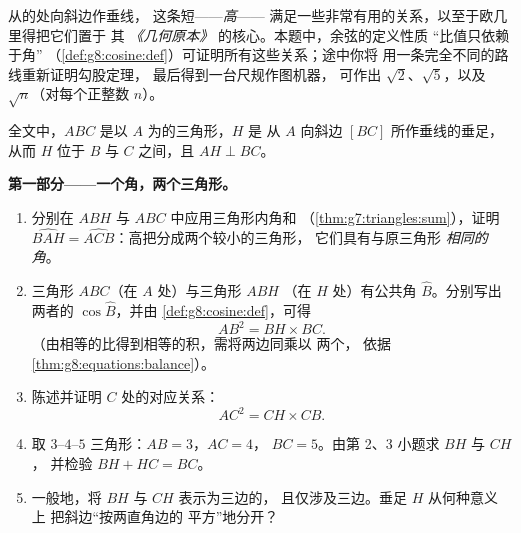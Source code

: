 \begin{problem}[{周末问题——直角三角形的高：
$AB^2 = BH \times BC$，$AH^2 = BH \times HC$，勾股定理的第二种证明，
以及开平方根的机器}]
\label{pb:g8:cosine:1}
从的处向斜边作垂线，
这条短——\emph{高}——
满足一些非常有用的关系，以至于欧几里得把它们置于
其 \emph{《几何原本》} 的核心。本题中，余弦的定义性质
“比值只依赖于角”
（\cref{def:g8:cosine:def}）可证明所有这些关系；途中你将
用一条完全不同的路线重新证明勾股定理，
最后得到一台尺规作图机器，
可作出 $\sqrt2$、$\sqrt5$，以及 $\sqrt{n}$（对每个正整数 $n$）。

全文中，$ABC$ 是以 $A$ 为的三角形，$H$ 是
从 $A$ 向斜边 $[BC]$ 所作垂线的垂足，
从而 $H$ 位于 $B$ 与 $C$ 之间，且 $AH \perp BC$。

\medskip
\noindent\textbf{第一部分——一个角，两个三角形。}
\begin{enumerate}
  \item 分别在 $ABH$ 与 $ABC$ 中应用三角形内角和
        （\cref{thm:g7:triangles:sum}），证明
        $\widehat{BAH} = \widehat{ACB}$：高把分成两个较小的三角形，
        它们具有与原三角形
        \emph{相同的角}。
  \item 三角形 $ABC$（在 $A$ 处）与三角形 $ABH$
        （在 $H$ 处）有公共角 $\widehat B$。分别写出两者的
        $\cos\widehat B$，并由
        \cref{def:g8:cosine:def}，可得
        \[
        AB^2 = BH \times BC .
        \]
        （由相等的比得到相等的积，需将两边同乘以
        两个，
        依据\cref{thm:g8:equations:balance}）。
  \item 陈述并证明 $C$ 处的对应关系：
        \[
        AC^2 = CH \times CB .
        \]
  \item 取 $3$--$4$--$5$ 三角形：$AB = 3$，$AC = 4$，
        $BC = 5$。由第 2、3 小题求 $BH$ 与 $CH$，
        并检验 $BH + HC = BC$。
  \item 一般地，将 $BH$ 与 $CH$ 表示为三边的，
        且仅涉及三边。垂足 $H$ 从何种意义上
        把斜边“按两直角边的
        平方”地分开？
\end{enumerate}


\end{problem}
